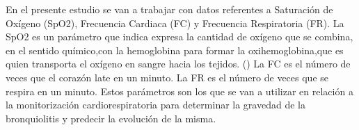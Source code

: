 En el presente estudio se van a trabajar con datos referentes a Saturación de Oxígeno (SpO2), Frecuencia Cardiaca (FC) y Frecuencia Respiratoria (FR). La SpO2 es un parámetro que indica expresa la cantidad de oxígeno que se combina, en el sentido químico,con la hemoglobina para formar la oxihemoglobina,que es quien transporta el oxígeno en sangre hacia los tejidos. (\cite{Laborde2004}) La FC es el número de veces que el corazón late en un minuto. La FR es el número de veces que se respira en un minuto. Estos parámetros son los que se van a utilizar en relación a la monitorización cardiorespiratoria para determinar la gravedad de la bronquiolitis y predecir la evolución de la misma.



